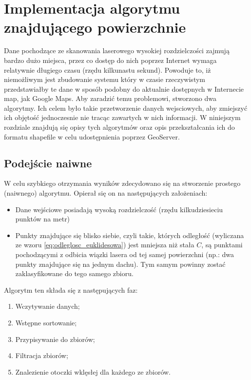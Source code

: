 \chapter{Implementacja algorytmu znajdującego powierzchnie}
\label{chap:implementacja}

Dane pochodzące ze skanowania laserowego wysokiej rozdzielczości zajmują bardzo dużo miejsca, przez co
dostęp do nich poprzez Internet wymaga relatywnie długiego czasu (rzędu kilkunastu sekund). Powoduje to,
iż niemożliwym jest zbudowanie systemu który w czasie rzeczywistym przedstawiałby te dane w sposób podobny
do aktualnie dostępnych w Internecie map, jak Google Maps. Aby zaradzić temu problemowi, stworzono dwa algorytmy.
Ich celem było takie przetworzenie danych wejsciowych, aby zmiejszyć ich objętość jednoczesnie nie tracąc zawartych w nich informacji.
W niniejszym rozdziale znajdują się opisy tych algorytmów oraz opis przekształcania ich do formatu shapefile w celu udostępnienia
poprzez GeoServer.

\section{Podejście naiwne}

W celu szybkiego otrzymania wyników zdecydowano się na stworzenie prostego (naiwnego) algorytmu. Opierał się on na następujących założeniach:
\begin{itemize}
    \item Dane wejściowe posiadają wysoką rozdzielczość (rzędu kilkudziesieciu punktów na metr)
    \item Punkty znajdujące się blisko siebie, czyli takie, których odległość (wyliczana ze wzoru \ref{eq:odleglosc_euklidesowa}) jest mniejsza niż
        stała $C$, są punktami pochodzącymi z odbicia wiązki lasera od tej samej powierzchni (np.: dwa punkty znajdujące się na jednym dachu).
        Tym samym powinny zostać zaklasyfikowane do tego samego zbioru.
\end{itemize}

\noindent Algorytm ten składa się z następujących faz:
\begin{enumerate}
    \item Wczytywanie danych;
    \item Wstępne sortowanie;
    \item Przypisywanie do zbiorów;
    \item Filtracja zbiorów;
    \item Znalezienie otoczki wklęsłej dla każdego ze zbiorów.
\end{enumerate}


